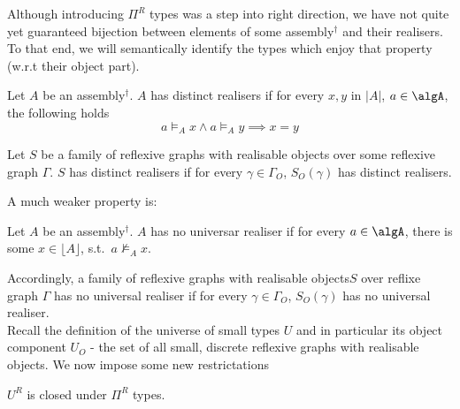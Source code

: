 \documentclass[12pt,a4paper]{article}
\renewcommand{\O}{_{O}}\alwaysmath{O}
\def\assembly{assembly$^\dagger$\xspace}
\def\asmrgs{reflexive graphs with realisable objects\xspace}
\begin{document}
Although introducing $\Pi^R$ types was a step into right direction, we have not quite yet guaranteed bijection between elements of some \assembly and their realisers. To that end, we will semantically identify the types which enjoy that property (w.r.t their object part).

\begin{definition}
  Let $A$ be an \assembly.  $A$ has distinct realisers if for every $x, y$ in $|A|$, $a \in \algA$, the following holds 
$$a \vDash_A x \land a \vDash_A y \implies x = y $$
\end{definition}
Let $S$ be a family of \asmrgs over some reflexive graph $\Gamma$. $S$ has distinct realisers if for every $\gamma \in \Gamma\O$, $S\O(\gamma)$ has distinct realisers.

A much weaker property  is:
\begin{definition}
    Let $A$ be an \assembly.  $A$ has no universar realiser if for every $a \in \algA$, there is some $x \in \lfloor A \rfloor$, s.t.\ $a \not\vDash_A x$. 
\end{definition}
Accordingly, a family of \asmrgs $S$ over reflixe graph $\Gamma$ has no universal realiser if for every $\gamma \in \Gamma\O$, $S\O(\gamma)$ has no universal realiser.\\

Recall the definition of the universe of small types $U$ and in particular its object component $U\O$ - the set of all small, discrete \asmrgs. We now impose some new restrictations
\begin{definition}[A subuniverse $U^R$]
  
\end{definition}

\begin{claim}
  $U^R$ is closed under $\Pi^R$ types.
\end{claim}
\end{document}
